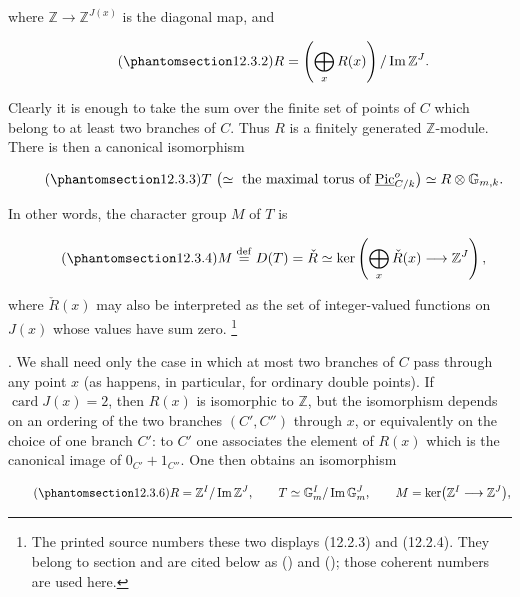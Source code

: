 \noindent
where $\mathbb Z\to\mathbb Z^{J(x)}$ is the diagonal map, and

\begin{equation}\tag{\SGARefTarget{sga7.sga7i.eix.n12-3-2}{12.3.2}}
 R=\left(\bigoplus_x R(x)\right)/\operatorname{Im}\mathbb Z^J.
\end{equation}

\noindent
Clearly it is enough to take the sum over the finite set of points of $C$
which belong to at least two branches of $C$. Thus $R$ is a finitely
generated $\mathbb Z$-module. There is then a canonical isomorphism

\begin{equation}\tag{\SGARefTarget{sga7.sga7i.eix.n12-3-3}{12.3.3}}
 T\ \bigl(\simeq\text{ the maximal torus of }
       \underline{\operatorname{Pic}}^o_{C/k}\bigr)
 \simeq R\otimes\mathbb G_{m,k}.
\end{equation}

\noindent
In other words, the character group $M$ of $T$ is

\begin{equation}\tag{\SGARefTarget{sga7.sga7i.eix.n12-3-4}{12.3.4}}
 M\mathrel{\mathop{=}^{\mathrm{def}}}D(T)=\check R
 \simeq\ker\left(\bigoplus_x\check R(x)\longrightarrow\mathbb Z^J\right),
\end{equation}

\noindent
where $\check R(x)$ may also be interpreted as the set of
integer-valued functions on $J(x)$ whose values have sum zero.
\footnote{The printed source numbers these two displays (12.2.3) and
(12.2.4). They belong to section  and are cited below as () and
(); those coherent numbers are used here.}

\medskip
\noindent
{}. We shall need only the case in which at most two branches of $C$
pass through any point $x$ (as happens, in particular, for ordinary double
points). If $\operatorname{card}J(x)=2$, then $R(x)$ is isomorphic to
$\mathbb Z$, but the isomorphism depends on an ordering of the two branches
$(C',C'')$ through $x$, or equivalently on the choice of one branch $C'$:
to $C'$ one associates the element of $R(x)$ which is the canonical image
of $0_{C'}+1_{C''}$. One then obtains an isomorphism

\begin{equation}\tag{\SGARefTarget{sga7.sga7i.eix.n12-3-6}{12.3.6}}
 R=\mathbb Z^I/\operatorname{Im}\mathbb Z^J,
 \qquad
 T\simeq\mathbb G_m^I/\operatorname{Im}\mathbb G_m^J,
 \qquad
 M=\ker\bigl(\mathbb Z^I\longrightarrow\mathbb Z^J\bigr),
\end{equation}

